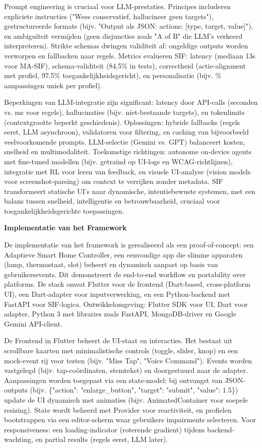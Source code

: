 \documentclass[openany]{book}
\begin{document}
Prompt engineering is cruciaal voor LLM-prestaties. Principes includeren expliciete instructies ("Wees conservatief, hallucineer geen targets"), gestructureerde formats (bijv. "Output als JSON: {actions: [{type, target, value}]}"), en ambiguïteit vermijden (geen disjuncties zoals "A of B" die LLM's verkeerd interpreteren). Strikte schemas dwingen validiteit af: ongeldige outputs worden verworpen en fallbacken naar regels. Metrics evalueren SIF: latency (mediaan 13s voor MA-SIF), schema-validiteit (84.5\% in tests), correctheid (actie-alignment met profiel, 97.5\% toegankelijkheidsgericht), en personalisatie (bijv. \% aanpassingen uniek per profiel).

Beperkingen van LLM-integratie zijn significant: latency door API-calls (seconden vs. ms voor regels), hallucinaties (bijv. niet-bestaande targets), en tokenlimits (contextgrootte beperkt geschiedenis). Oplossingen: hybride fallbacks (regels eerst, LLM asynchroon), validatoren voor filtering, en caching van bijvoorbeeld veelvoorkomende prompts. LLM-selectie (Gemini vs. GPT) balanceert kosten, snelheid en multimodaliteit. Toekomstige richtingen: autonome on-device agents met fine-tuned modellen (bijv. getraind op UI-logs en WCAG-richtlijnen), integratie met RL voor leren van feedback, en visuele UI-analyse (vision models voor screenshot-parsing) om context te verrijken zonder metadata.
SIF transformeert statische UI's naar dynamische, intentiebewuste systemen, met een balans tussen snelheid, intelligentie en betrouwbaarheid, cruciaal voor toegankelijkheidsgerichte toepassingen.

\textbf{Implementatie van het Framework}

De implementatie van het framework is gerealiseerd als een proof-of-concept: een Adaptieve Smart Home Controller, een eenvoudige app die slimme apparaten (lamp, thermostaat, slot) beheert en dynamisch aanpast op basis van gebruikersevents. Dit demonstreert de end-to-end workflow en portability over platforms. De stack omvat Flutter voor de frontend (Dart-based, cross-platform UI), een Dart-adapter voor inputverwerking, en een Python-backend met FastAPI voor SIF-logica. Ontwikkelomgeving: Flutter SDK voor UI, Dart voor adapter, Python 3 met libraries zoals FastAPI, MongoDB-driver en Google Gemini API-client.

De Frontend in Flutter beheert de UI-staat en interacties. Het bestaat uit scrollbare kaarten met minimalistische controls (toggle, slider, knop) en een mock-event rij voor testen (bijv. "Miss Tap", "Voice Command"). Events worden vastgelegd (bijv. tap-coördinaten, stemtekst) en doorgestuurd naar de adapter. Aanpassingen worden toegepast via een state-model: bij ontvangst van JSON-outputs (bijv. \{"action": "enlarge\_button", "target": "submit", "value": 1.5\}) update de UI dynamisch met animaties (bijv. AnimatedContainer voor soepele resizing). State wordt beheerd met Provider voor reactiviteit, en profielen bootstrappen via een editor-scherm waar gebruikers impairments selecteren. Voor responsiveness: een loading-indicator (roterende gradient) tijdens backend-wachting, en partial results (regels eerst, LLM later).
\end{document}
